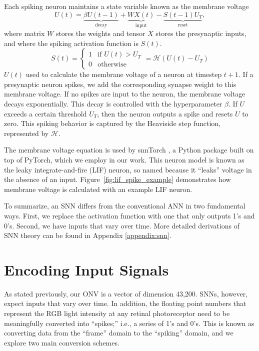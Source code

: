 \documentclass [MS] {UCLAthesis}
\begin{document}
Each spiking neuron maintains a state variable known as the membrane voltage
\begin{equation}
U(t) = \underbrace{\beta U(t-1)}_{\text{decay}}
+ \underbrace{W X(t)}_{\text{input}}
- \underbrace{S(t-1)U_T}_{\text{reset}},
\end{equation}
where matrix $W$ stores the weights and tensor $X$ stores the presynaptic inputs, and where the spiking activation function is $S(t)$.
\begin{equation}
S(t) = \begin{cases} 
      1 & \text{if } U(t) > U_T \\
      0 & \text{otherwise }
      \end{cases}
      = \mathcal{H} (U(t) - U_T)
\end{equation}
$U(t)$ used to calculate the membrane voltage of a neuron at timestep $t+1$. If a presynaptic neuron spikes, we add the corresponding synapse weight to this membrane voltage. If no spikes are input to the neuron, the membrane voltage decays exponentially. This decay is controlled with the hyperparameter $\beta$. If $U$ exceeds a certain threshold $U_T$, then the neuron outputs a spike and resets $U$ to zero. This spiking behavior is captured by the Heaviside step function, represented by $\mathcal{H}$. 

The membrane voltage equation is used by snnTorch \citep{snnTorch}, a Python package built on top of PyTorch, which we employ in our work. This neuron model is known as the leaky integrate-and-fire (LIF) neuron, so named because it ``leaks'' voltage in the absence of an input. Figure~\ref{fig:lif_spike_example} demonstrates how membrane voltage is calculated with an example LIF neuron. 

To summarize, an SNN differs from the conventional ANN in two fundamental ways. First, we replace the activation function with one that only outputs 1's and 0's. Second, we have inputs that vary over time. More detailed derivations of SNN theory can be found in Appendix \ref{appendix:snn}.


\section{Encoding Input Signals}

As stated previously, our ONV is a vector of dimension 43,200. SNNs, however, expect inputs that vary over time. In addition, the floating point numbers that represent the RGB light intensity at any retinal photoreceptor need to be meaningfully converted into ``spikes;'' i.e., a series of 1's and 0's. This is known as converting data from the ``frame'' domain to the ``spiking'' domain, and we explore two main conversion schemes.
\end{document}
